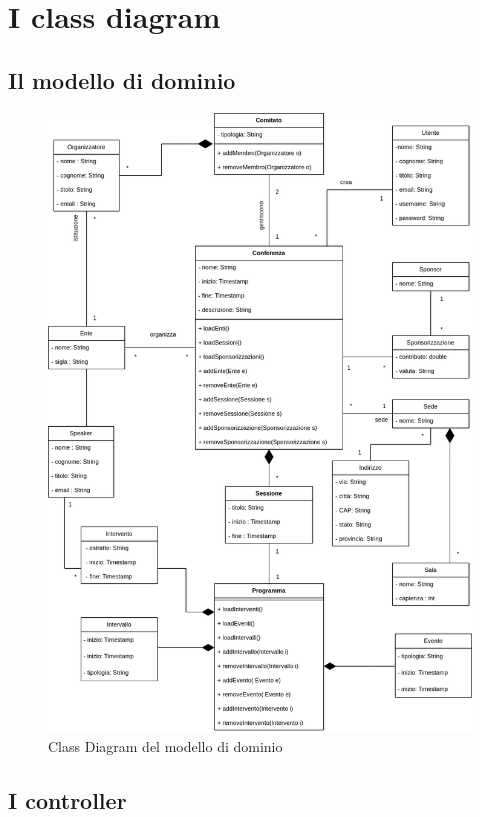 \newpage
\section{I class diagram}
\subsection{Il modello di dominio}
\begin{figure}[h!]
	\centering
	\includegraphics[scale=0.5]{Immagini/Schema_Concettuale.png}
	\caption{Class Diagram del modello di dominio}\label{uml:modellodominio}
\end{figure}

\newpage
\subsection{I controller}
